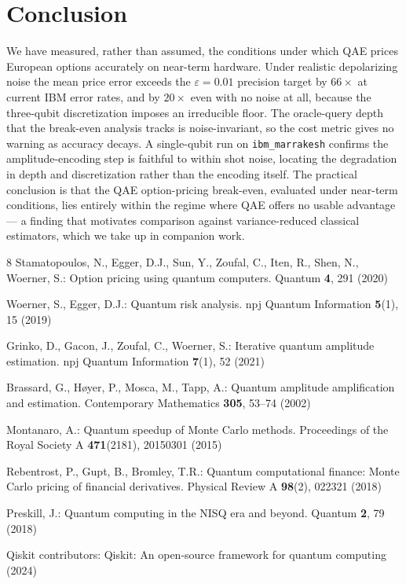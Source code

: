 \documentclass[runningheads]{llncs}
\begin{document}
\section{Conclusion}
We have measured, rather than assumed, the conditions under which QAE prices
European options accurately on near-term hardware. Under realistic depolarizing
noise the mean price error exceeds the $\varepsilon = 0.01$ precision target by
$66\times$ at current IBM error rates, and by $20\times$ even with no noise at
all, because the three-qubit discretization imposes an irreducible floor. The
oracle-query depth that the break-even analysis tracks is noise-invariant, so the
cost metric gives no warning as accuracy decays. A single-qubit run on
\texttt{ibm\_marrakesh} confirms the amplitude-encoding step is faithful to
within shot noise, locating the degradation in depth and discretization rather
than the encoding itself. The practical conclusion is that the QAE
option-pricing break-even, evaluated under near-term conditions, lies entirely
within the regime where QAE offers no usable advantage --- a finding that
motivates comparison against variance-reduced classical estimators, which we take
up in companion work.

\begin{thebibliography}{8}
Stamatopoulos, N., Egger, D.J., Sun, Y., Zoufal, C., Iten, R., Shen, N., Woerner, S.:
Option pricing using quantum computers. Quantum \textbf{4}, 291 (2020)

Woerner, S., Egger, D.J.: Quantum risk analysis. npj Quantum Information
\textbf{5}(1), 15 (2019)

Grinko, D., Gacon, J., Zoufal, C., Woerner, S.: Iterative quantum amplitude
estimation. npj Quantum Information \textbf{7}(1), 52 (2021)

Brassard, G., H{\o}yer, P., Mosca, M., Tapp, A.: Quantum amplitude amplification
and estimation. Contemporary Mathematics \textbf{305}, 53--74 (2002)

Montanaro, A.: Quantum speedup of Monte Carlo methods. Proceedings of the Royal
Society A \textbf{471}(2181), 20150301 (2015)

Rebentrost, P., Gupt, B., Bromley, T.R.: Quantum computational finance: Monte
Carlo pricing of financial derivatives. Physical Review A \textbf{98}(2), 022321
(2018)

Preskill, J.: Quantum computing in the NISQ era and beyond. Quantum \textbf{2},
79 (2018)

Qiskit contributors: Qiskit: An open-source framework for quantum computing
(2024)
\end{thebibliography}
\end{document}
